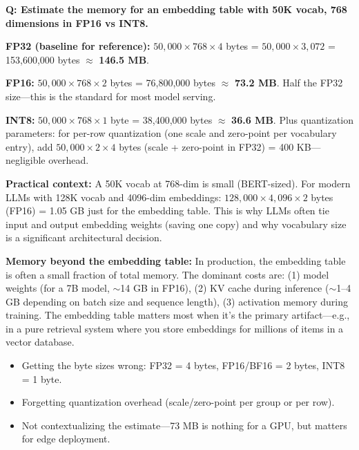 \begin{interviewq}
\textbf{Q: Estimate the memory for an embedding table with 50K vocab, 768 dimensions in FP16 vs INT8.}

 \quad {} \quad \badgefreq{\freqmed}

\stronganswer

\textbf{FP32 (baseline for reference):} $50{,}000 \times 768 \times 4$ bytes = $50{,}000 \times 3{,}072$ = 153,600,000 bytes $\approx$ \textbf{146.5 MB}.

\textbf{FP16:} $50{,}000 \times 768 \times 2$ bytes = 76,800,000 bytes $\approx$ \textbf{73.2 MB}. Half the FP32 size---this is the standard for most model serving.

\textbf{INT8:} $50{,}000 \times 768 \times 1$ byte = 38,400,000 bytes $\approx$ \textbf{36.6 MB}. Plus quantization parameters: for per-row quantization (one scale and zero-point per vocabulary entry), add $50{,}000 \times 2 \times 4$ bytes (scale + zero-point in FP32) = 400 KB---negligible overhead.

\textbf{Practical context:} A 50K vocab at 768-dim is small (BERT-sized). For modern LLMs with 128K vocab and 4096-dim embeddings: $128{,}000 \times 4{,}096 \times 2$ bytes (FP16) = 1.05 GB just for the embedding table. This is why LLMs often tie input and output embedding weights (saving one copy) and why vocabulary size is a significant architectural decision.

\textbf{Memory beyond the embedding table:} In production, the embedding table is often a small fraction of total memory. The dominant costs are: (1) model weights (for a 7B model, $\sim$14 GB in FP16), (2) KV cache during inference ($\sim$1--4 GB depending on batch size and sequence length), (3) activation memory during training. The embedding table matters most when it's the primary artifact---e.g., in a pure retrieval system where you store embeddings for millions of items in a vector database.

\redflags
\begin{itemize}
    \item Getting the byte sizes wrong: FP32 = 4 bytes, FP16/BF16 = 2 bytes, INT8 = 1 byte.
    \item Forgetting quantization overhead (scale/zero-point per group or per row).
    \item Not contextualizing the estimate---73 MB is nothing for a GPU, but matters for edge deployment.
\end{itemize}


\end{interviewq}
